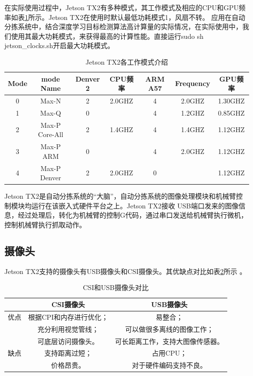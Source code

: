在实际使用过程中，Jetson TX2有多种模式，其工作模式及相应的CPU和GPU频率如表\ref{table:TX2:mode}所示。Jetson TX2在使用时默认最低功耗模式1，风扇不转。
应用在自动分拣系统中，结合深度学习目标检测算法高计算量的实际情况，在实际使用中，我们使用其最大功耗模式，来获得最高的计算性能。直接运行sudo sh jetson\_clocks.sh开启最大功耗模式。


{
    \begin{table}[htb] 
        \caption{Jetson TX2各工作模式介绍}
        \label{table:TX2:mode}
        \centering
        \begin{tabular}[t]{c|c|c|c|c|c|c}
            \hline
            Mode & mode Name & Denver 2 & CPU频率 & ARM A57 & Frequency & GPU频率  \\
            \hline
            0 & Max-N & 2 & 2.0GHZ & 4 & 2.0GHZ & 1.30GHZ \\
            \hline 
            1 & Max-Q & 0 & & 4 & 1.2GHZ & 0.85GHZ \\
            \hline
            2 & Max-P Core-All & 2 & 1.4GHZ & 4 & 1.4GHZ & 1.12GHZ \\
            \hline
            3 & Max-P ARM & 0 & & 4 & 2.0GHZ & 1.12GHZ \\
            \hline
            4 & Max-P Denver & 2 & 2.0GHZ & 0 & & 1.12GHZ \\
            \hline
        \end{tabular} 
    \end{table}
}

Jetson TX2是自动分拣系统的“大脑”，自动分拣系统的图像处理模块和机械臂控制模块均运行在该嵌入式硬件平台之上。Jetson TX2接收
USB端口发来的图像信息，经过处理后，转化为机械臂的控制G代码，通过串口发送给机械臂执行微机，控制机械臂执行抓取动作。


\subsection{摄像头}

Jetson TX2支持的摄像头有USB摄像头和CSI摄像头。其优缺点对比如表\ref{table:camera:compare}所示 \cite{CSI}。

{
    \begin{table}[htb] 
        \caption{CSI和USB摄像头对比}
        \label{table:camera:compare}
        \centering
        \begin{tabular}[t]{c|c|c}
            \hline
             & CSI摄像头 & USB摄像头  \\
            \hline
            优点 & 根据CPI和内存进行优化； & 易整合； \\
                & 充分利用视觉管线； & 可以做很多离线的图像工作；\\
                & 可底层访问摄像头。 & 可长距离工作，支持大图像传感器。 \\
            \hline 
            缺点 & 支持距离过短； & 占用CPU；\\
                 & 价格昂贵。 & 对于硬件编码支持不良。\\
            \hline
        \end{tabular} 
    \end{table}
}

